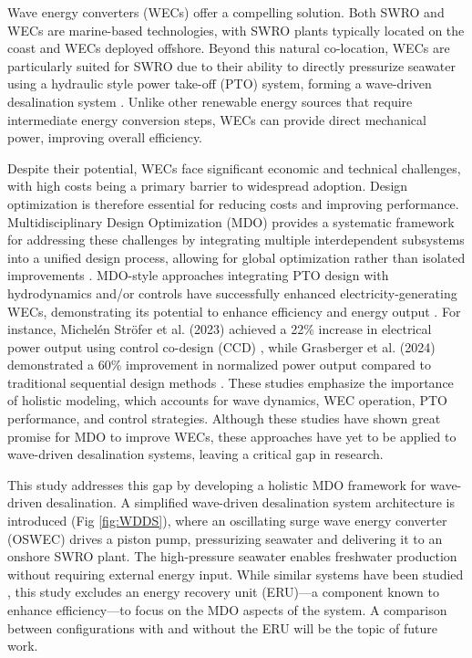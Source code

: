 \documentclass[twocolumn,10pt]{asme2e}
\begin{document}
Wave energy converters (WECs) offer a compelling solution. Both SWRO and WECs are marine-based technologies, with SWRO plants typically located on the coast and WECs deployed offshore. Beyond this natural co-location, WECs are particularly suited for SWRO \cite{blue_econ} due to their ability to directly pressurize seawater using a hydraulic style power take-off (PTO) system, forming a wave-driven desalination system \cite{Davies2005}. Unlike other renewable energy sources that require intermediate energy conversion steps, WECs can provide direct mechanical power, improving overall efficiency. 

Despite their potential, WECs face significant economic and technical challenges, with high costs being a primary barrier to widespread adoption. Design optimization is therefore essential for reducing costs and improving performance. Multidisciplinary Design Optimization (MDO) provides a systematic framework for addressing these challenges by integrating multiple interdependent subsystems into a unified design process, allowing for global optimization rather than isolated improvements \cite{Sobieski}. MDO-style approaches integrating PTO design with hydrodynamics and/or controls have successfully enhanced electricity-generating WECs, demonstrating its potential to enhance efficiency and energy output \cite{Stroefer2023,PenaSanchez2022,Rosati2023,Grasberger2024}. For instance, Michelén Ströfer et al. (2023) achieved a 22\% increase in electrical power output using control co-design (CCD) \cite{Stroefer2023}, while Grasberger et al. (2024) demonstrated a 60\% improvement in normalized power output compared to traditional sequential design methods \cite{Grasberger2024}. These studies emphasize the importance of holistic modeling, which accounts for wave dynamics, WEC operation, PTO performance, and control strategies. Although these studies have shown great promise for MDO to improve WECs, these approaches have yet to be applied to wave-driven desalination systems, leaving a critical gap in research. 

This study addresses this gap by developing a holistic MDO framework for wave-driven desalination. A simplified wave-driven desalination system architecture is introduced (Fig \ref{fig:WDDS}), where an oscillating surge wave energy converter (OSWEC) drives a piston pump, pressurizing seawater and delivering it to an onshore SWRO plant. The high-pressure seawater enables freshwater production without requiring external energy input. While similar systems have been studied \cite{Yu2018,Suchithra2022,Mi2023,Simmons2024}, this study excludes an energy recovery unit (ERU)---a component known to enhance efficiency---to focus on the MDO aspects of the system. A comparison between configurations with and without the ERU will be the topic of future work.
\end{document}
